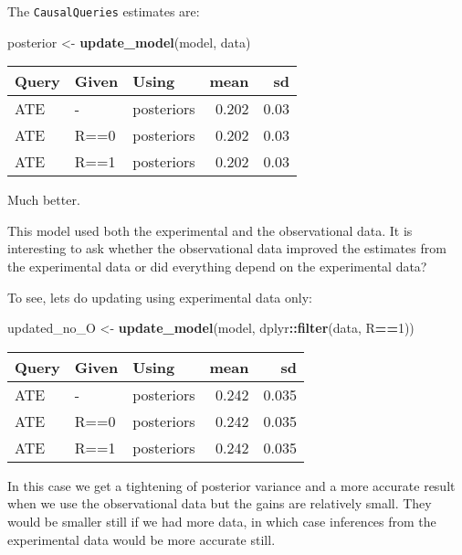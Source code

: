 \documentclass[
  12pt,
]{book}
\newenvironment{Shaded}{\begin{snugshade}}{\end{snugshade}}
\newcommand{\DecValTok}[1]{\textcolor[rgb]{0.00,0.00,0.81}{#1}}
\newcommand{\KeywordTok}[1]{\textcolor[rgb]{0.13,0.29,0.53}{\textbf{#1}}}
\newcommand{\NormalTok}[1]{#1}
\newcommand{\OperatorTok}[1]{\textcolor[rgb]{0.81,0.36,0.00}{\textbf{#1}}}
\newcommand{\StringTok}[1]{\textcolor[rgb]{0.31,0.60,0.02}{#1}}
\begin{document}
The \texttt{CausalQueries} estimates are:

\begin{Shaded}
\begin{Highlighting}[]
\NormalTok{posterior <-}\StringTok{ }\KeywordTok{update_model}\NormalTok{(model, data)}
\end{Highlighting}
\end{Shaded}

\begin{tabular}{l|l|l|r|r}
\hline
Query & Given & Using & mean & sd\\
\hline
ATE & - & posteriors & 0.202 & 0.03\\
\hline
ATE & R==0 & posteriors & 0.202 & 0.03\\
\hline
ATE & R==1 & posteriors & 0.202 & 0.03\\
\hline
\end{tabular}

Much better.

This model used both the experimental and the observational data. It is interesting to ask whether the observational data improved the estimates from the experimental data or did everything depend on the experimental data?

To see, lets do updating using experimental data only:

\begin{Shaded}
\begin{Highlighting}[]
\NormalTok{updated_no_O <-}\StringTok{ }\KeywordTok{update_model}\NormalTok{(model, dplyr}\OperatorTok{::}\KeywordTok{filter}\NormalTok{(data, R}\OperatorTok{==}\DecValTok{1}\NormalTok{))}
\end{Highlighting}
\end{Shaded}

\begin{tabular}{l|l|l|r|r}
\hline
Query & Given & Using & mean & sd\\
\hline
ATE & - & posteriors & 0.242 & 0.035\\
\hline
ATE & R==0 & posteriors & 0.242 & 0.035\\
\hline
ATE & R==1 & posteriors & 0.242 & 0.035\\
\hline
\end{tabular}

In this case we get a tightening of posterior variance and a more accurate result when we use the observational data but the gains are relatively small. They would be smaller still if we had more data, in which case inferences from the experimental data would be more accurate still.
\end{document}
